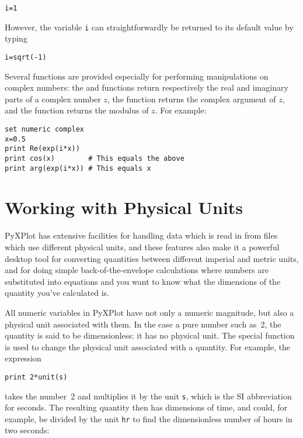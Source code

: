 \begin{verbatim}
i=1
\end{verbatim}

\noindent However, the variable {\tt i} can straightforwardly be returned to
its default value by typing

\begin{verbatim}
i=sqrt(-1)
\end{verbatim}

Several functions are provided especially for performing manipulations on
complex numbers: the  and  functions return
respectively the real and imaginary parts of a complex number $z$, the
 function returns the complex argument of $z$, and the
 function returns the modulus of $z$. For example:

\begin{verbatim}
set numeric complex
x=0.5
print Re(exp(i*x))
print cos(x)        # This equals the above
print arg(exp(i*x)) # This equals x
\end{verbatim}

\section{Working with Physical Units}
\label{sec:units}

PyXPlot has extensive facilities for handling data which is read in from files
which use different physical units, and these features also make it a powerful
desktop tool for converting quantities between different imperial and metric
units, and for doing simple back-of-the-envelope calculations where numbers are
substituted into equations and you want to know what the dimensions of the
quantity you've calculated is.

All numeric variables in PyXPlot have not only a numeric magnitude, but also a
physical unit associated with them. In the case a pure number such as~2, the
quantity is said to be dimensionless: it has no physical unit. The special
function  is used to change the physical unit associated with a
quantity. For example, the expression

\begin{verbatim}
print 2*unit(s)
\end{verbatim}

\noindent takes the number~2 and multiplies it by the unit {\tt s}, which is
the SI abbreviation for seconds.  The resulting quantity then has dimensions of
time, and could, for example, be divided by the unit {\tt hr} to find the
dimensionless number of hours in two seconds:

